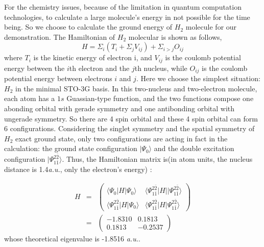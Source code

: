 \def\CTeXPreproc{Created by ctex v0.2.12, don't edit!}\documentclass[twocolumn,showpacs,twoside,10pt,superscriptaddress,prl]{revtex4}
\begin{document}
For the chemistry issues, because of the limitation in quantum
computation technologies, to calculate a large molecule's energy in
not possible for the time being. So we choose to calculate the
ground energy of $H_2$ molecule for our demonstration. The
Hamiltonian of $H_2$ molecular is shown as follows,
$$
    H=\Sigma_i(T_i+\Sigma_j{V_{ij}})+\Sigma_{i>j}{O_{ij}}
$$
where $T_i$ is the kinetic energy of electron i, and $V_{ij}$ is the
coulomb potential energy between the $i$th electron and the $j$th
nucleus, while $O_{ij}$ is the coulomb potential energy between
electrons $i$ and $j$. Here we choose the simplest situation: $H_2$
in the minimal STO-3G basis. In this two-nucleus and two-electron
molecule, each atom has a $1s$ Guassian-type function, and the two
functions compose one abonding orbital with gerade symmetry and one
antibonding orbital with ungerade symmetry. So there are 4 spin
orbital and these 4 spin orbital can form 6 configurations.
Considering the singlet symmetry and the spatial symmetry of $H_2$
exact ground state, only two configurations are acting in fact in
the calculation: the ground state configuration $|\Psi_0\rangle$ and
the double excitation configuration
$|\Psi_{1\bar{1}}^{2\bar{2}}\rangle$. Thus, the Hamiltonian matrix
is(in atom units, the nucleus distance is 1.4\emph{a.u.}, only the
electron's energy) :\cite{quantchemistry}


\begin{eqnarray}
        H&=&
        \begin{pmatrix}
            \langle\Psi_0|H|\Psi_0\rangle & \langle\Psi_{1\bar{1}}^{2\bar{2}}|H||\Psi_{1\bar{1}}^{2\bar{2}}\rangle\\
            \langle\Psi_{1\bar{1}}^{2\bar{2}}|H|\Psi_0\rangle & \langle\Psi_{1\bar{1}}^{2\bar{2}}|H|\Psi_{1\bar{1}}^{2\bar{2}}\rangle
            \end{pmatrix}\nonumber\\
        &=& \begin{pmatrix}
            -1.8310 & 0.1813\\
            0.1813 & -0.2537
            \end{pmatrix}
\end{eqnarray}
whose theoretical eigenvalue is -1.8516 \emph{a.u.}.
\end{document}
